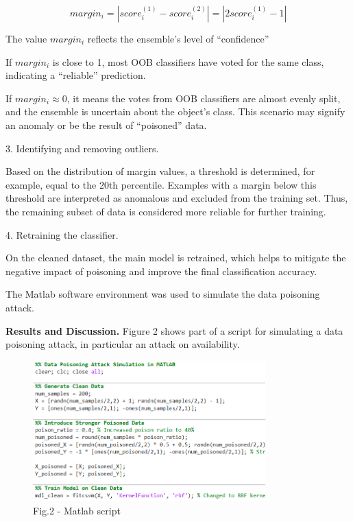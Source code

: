 \begin{multicols}{2}
\[margin_{i} = \left| score_{i}^{(1)} - score_{i}^{(2)} \right| = \left| 2score_{i}^{(1)} - 1 \right|\]

The value \(margin_{i}\) reflects the ensemble's level of ``confidence''

If \(margin_{i}\) is close to 1, most OOB classifiers have voted for the
same class, indicating a ``reliable'' prediction.

If \(margin_{i} \approx 0\), it means the votes from OOB classifiers are
almost evenly split, and the ensemble is uncertain about the object's
class. This scenario may signify an anomaly or be the result of
``poisoned'' data.

3. Identifying and removing outliers.

Based on the distribution of margin values, a threshold is determined,
for example, equal to the 20th percentile. Examples with a margin below
this threshold are interpreted as anomalous and excluded from the
training set. Thus, the remaining subset of data is considered more
reliable for further training.

4. Retraining the classifier.

On the cleaned dataset, the main model is retrained, which helps to
mitigate the negative impact of poisoning and improve the final
classification accuracy.

The Matlab software environment was used to simulate the data poisoning
attack.

{\bfseries Results and Discussion.} Figure 2 shows part of a script for
simulating a data poisoning attack, in particular an attack on
availability.
\end{multicols}

\begin{figure}[H]
	\centering
	\includegraphics[width=0.8\textwidth]{media/ict2/image225}
	\caption*{Fig.2 - Matlab script}
\end{figure}

